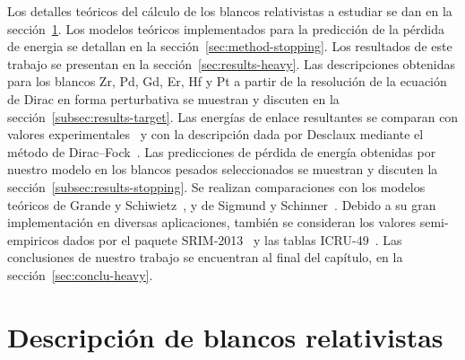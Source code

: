 
Los detalles teóricos del cálculo de los blancos relativistas a estudiar 
se dan en la sección~\ref{sec:method-target}. Los modelos teóricos 
implementados para la predicción de la pérdida de energia se detallan en 
la sección~\ref{sec:method-stopping}. Los resultados de este trabajo se 
presentan en la sección~\ref{sec:results-heavy}. Las descripciones 
obtenidas para los blancos Zr, Pd, Gd, Er, Hf y Pt a partir de la 
resolución de la ecuación de Dirac en forma perturbativa se muestran y 
discuten en la sección~\ref{subsec:results-target}. 
Las energías de enlace resultantes se comparan con valores 
experimentales~\cite{Williams:95} y con la descripción dada por 
Desclaux mediante el método de Dirac--Fock~\cite{Desclaux:73}. 
Las predicciones de pérdida de energía obtenidas por nuestro modelo en 
los blancos pesados seleccionados se muestran y discuten la
sección~\ref{subsec:results-stopping}. Se realizan comparaciones con los 
modelos teóricos de Grande y Schiwietz~\cite{Grande:01,casp52}, y de 
Sigmund y Schinner~\cite{DPASS20}. Debido a su gran implementación en 
diversas aplicaciones, también se consideran los valores semi-empiricos 
dados por el paquete SRIM-2013~\cite{Ziegler01} y las tablas 
ICRU-49~\cite{ICRU49}. Las conclusiones de nuestro trabajo se encuentran 
al final del capítulo, en la sección~\ref{sec:conclu-heavy}.

\section{Descripción de blancos relativistas}
\label{sec:method-target}

